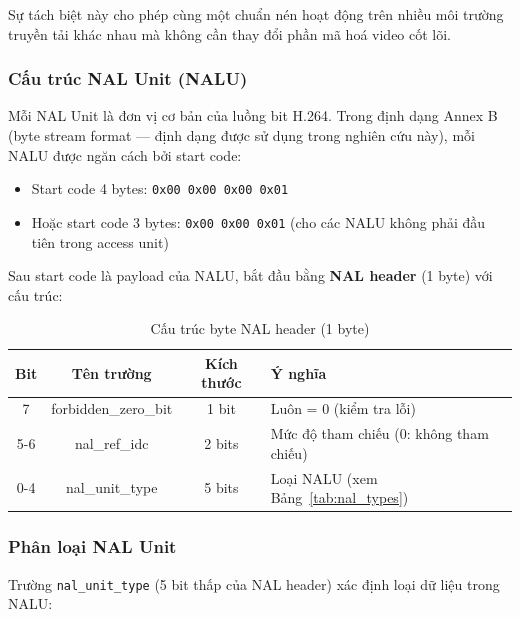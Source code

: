 Sự tách biệt này cho phép cùng một chuẩn nén hoạt động trên nhiều môi trường
truyền tải khác nhau mà không cần thay đổi phần mã hoá video cốt lõi.

\subsubsection{Cấu trúc NAL Unit (NALU)}

Mỗi NAL Unit là đơn vị cơ bản của luồng bit H.264. Trong định dạng Annex B
(byte stream format --- định dạng được sử dụng trong nghiên cứu này), mỗi NALU
được ngăn cách bởi start code:

\begin{itemize}
  \item Start code 4 bytes: \texttt{0x00 0x00 0x00 0x01}
  \item Hoặc start code 3 bytes: \texttt{0x00 0x00 0x01} (cho các NALU không phải đầu tiên trong access unit)
\end{itemize}

Sau start code là payload của NALU, bắt đầu bằng \textbf{NAL header} (1 byte) với cấu trúc:

\begin{table}[ht]
\centering
\caption{Cấu trúc byte NAL header (1 byte)}
\label{tab:nal_header}
\begin{tabular}{cccl}
\toprule
Bit & Tên trường & Kích thước & Ý nghĩa \\
\midrule
7   & forbidden\_zero\_bit  & 1 bit  & Luôn = 0 (kiểm tra lỗi) \\
5-6 & nal\_ref\_idc         & 2 bits & Mức độ tham chiếu (0: không tham chiếu) \\
0-4 & nal\_unit\_type       & 5 bits & Loại NALU (xem Bảng~\ref{tab:nal_types}) \\
\bottomrule
\end{tabular}
\end{table}

\subsubsection{Phân loại NAL Unit}

Trường \texttt{nal\_unit\_type} (5 bit thấp của NAL header) xác định loại dữ liệu
trong NALU:

